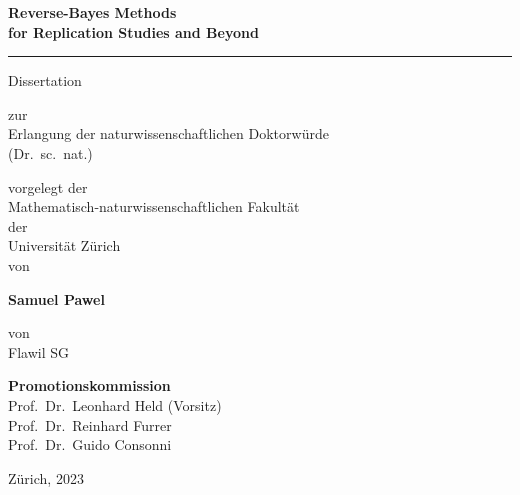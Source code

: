 \documentclass[fontsize=14pt]{scrreprt}
\begin{document}
\begin{titlepage}
\enlargethispage{\baselineskip}
\centering

{\sffamily
{\Large \textbf{Reverse-Bayes Methods \\ for Replication Studies and Beyond}}

\vspace*{1.5cm}
\hrule
\vspace*{1.5cm}

{\large\sffamily Dissertation}

\vspace*{1cm}

zur\\
Erlangung der naturwissenschaftlichen Doktorwürde\\
(Dr.~sc.~nat.)

\vspace*{1cm}

vorgelegt der\\
Mathematisch-naturwissenschaftlichen Fakultät\\
der\\
Universität Zürich\\[1em]

von

\vspace*{1em}
{\large\sffamily \textbf{Samuel Pawel}}
\vspace*{1em}

von\\
Flawil SG

\vspace*{1.5cm}

{\bfseries\sffamily Promotionskommission}\\[1ex]
Prof.~Dr.~Leonhard Held (Vorsitz)\\
Prof.~Dr.~Reinhard Furrer\\
Prof.~Dr.~Guido Consonni

\vspace*{1.5cm}

Zürich, 2023
}
\end{titlepage}
\end{document}
